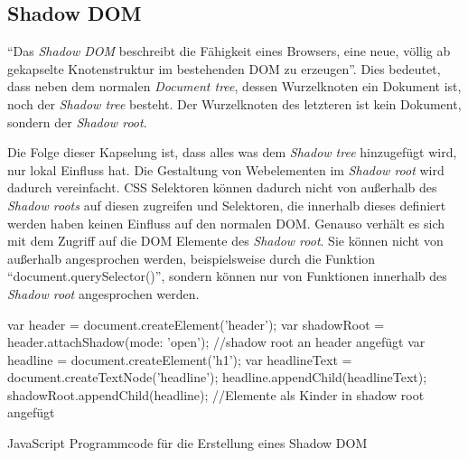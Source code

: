 \documentclass[12pt, paper=a4, bibtotoc, toc=listof, headsepline=true]{scrreprt}
\begin{document}
		\subsection{Shadow DOM}
		\enquote{Das \emph{Shadow \ac{DOM}} beschreibt die Fähigkeit eines Browsers, eine neue, völlig ab gekapselte Knotenstruktur im bestehenden \ac{DOM} zu erzeugen}\cite[Kap. 11.1.4]{gasston2014moderne}. Dies bedeutet, dass neben dem normalen \emph{Document tree}, dessen Wurzelknoten ein Dokument ist, noch der \emph{Shadow tree} besteht. Der Wurzelknoten des letzteren ist kein Dokument, sondern der \emph{Shadow root}.

		Die Folge dieser Kapselung ist, dass alles was dem \emph{Shadow tree} hinzugefügt wird, nur lokal Einfluss hat. Die Gestaltung von Webelementen im \emph{Shadow root} wird dadurch vereinfacht.
		\ac{CSS} Selektoren können dadurch nicht von außerhalb des \emph{Shadow roots} auf diesen zugreifen und Selektoren, die innerhalb dieses definiert werden haben keinen Einfluss auf den normalen \ac{DOM}. Genauso verhält es sich mit dem Zugriff auf die \ac{DOM} Elemente des \emph{Shadow root}. Sie können nicht von außerhalb angesprochen werden, beispielsweise durch die Funktion \enquote{document.querySelector()}, sondern können nur von Funktionen innerhalb des \emph{Shadow root} angesprochen werden\cite{Bidelman2016}.
		\begin{listing}
			\begin{JavaScriptcode*}{}
var header = document.createElement('header'); 
var shadowRoot = header.attachShadow({mode: 'open'}); //shadow root an header angefügt
var headline = document.createElement('h1'); 
var headlineText = document.createTextNode('headline');
headline.appendChild(headlineText);
shadowRoot.appendChild(headline); //Elemente als Kinder in shadow root angefügt
			\end{JavaScriptcode*}
				\caption[Erstellung eines Shadow DOM]{JavaScript Programmcode für die Erstellung eines Shadow DOM}
				\label{lst:javShaDom}
		\end{listing}
\end{document}
